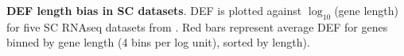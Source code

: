 \textbf{DEF length bias in SC datasets}. DEF is plotted against $\log_{10}$(gene length) for five SC RNAseq datasets from \citep{Zeisel_2015,Tasic_2016,Zeisel_2018,Saunders_2018,Tasic_2018}. Red bars represent average DEF for genes binned by gene length (4 bins per log unit), sorted by length).

